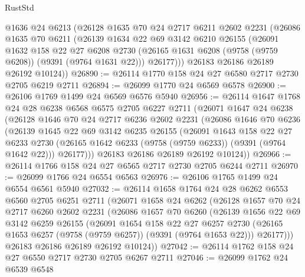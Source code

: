 \begin{lexlean}{RustStd}
\begin{coremodule}
      @1636
      @24
      @6213
      (@26128
        @1635
        @70
        @24
        @2717
        @6211
        @2602
        @2231
        (@26086
          @1635
          @70
          @6211
          (@26139
            @1634
            @22
            @69
            @3142
            @6210
            @26155
            (@26091
              @1632
              @158
              @22
              @27
              @6208
              @2730
              (@26165 @1631 @6208 (@9758 (@9759 @6208)) (@9391 (@9764 @1631 @22)))
              @26177)))
        @26183
        @26186
        @26189
        @26192
        @10124))
@26890 := @26114 @1770 @158 @24 @27 @6580 @2717 @2730 @2705 @6219 @2711
@26894 := @26099 @1770 @24 @6569 @6578
@26900 := @26106 @1769 @1499 @24 @6569 @6576 @5940
@26956 := @26114
    @1647
    @1768
    @24
    @28
    @6238
    @6568
    @6575
    @2705
    @6227
    @2711
    (@26071
      @1647
      @24
      @6238
      (@26128
        @1646
        @70
        @24
        @2717
        @6236
        @2602
        @2231
        (@26086
          @1646
          @70
          @6236
          (@26139
            @1645
            @22
            @69
            @3142
            @6235
            @26155
            (@26091
              @1643
              @158
              @22
              @27
              @6233
              @2730
              (@26165 @1642 @6233 (@9758 (@9759 @6233)) (@9391 (@9764 @1642 @22)))
              @26177)))
        @26183
        @26186
        @26189
        @26192
        @10124))
@26966 := @26114 @1766 @158 @24 @27 @6565 @2717 @2730 @2705 @6244 @2711
@26970 := @26099 @1766 @24 @6554 @6563
@26976 := @26106 @1765 @1499 @24 @6554 @6561 @5940
@27032 := @26114
    @1658
    @1764
    @24
    @28
    @6262
    @6553
    @6560
    @2705
    @6251
    @2711
    (@26071
      @1658
      @24
      @6262
      (@26128
        @1657
        @70
        @24
        @2717
        @6260
        @2602
        @2231
        (@26086
          @1657
          @70
          @6260
          (@26139
            @1656
            @22
            @69
            @3142
            @6259
            @26155
            (@26091
              @1654
              @158
              @22
              @27
              @6257
              @2730
              (@26165 @1653 @6257 (@9758 (@9759 @6257)) (@9391 (@9764 @1653 @22)))
              @26177)))
        @26183
        @26186
        @26189
        @26192
        @10124))
@27042 := @26114 @1762 @158 @24 @27 @6550 @2717 @2730 @2705 @6267 @2711
@27046 := @26099 @1762 @24 @6539 @6548

\end{coremodule}
\end{lexlean}

